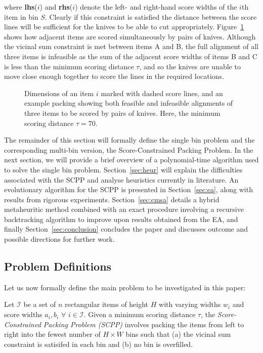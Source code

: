 \documentclass[authoryear]{elsarticle}
\begin{document}
\noindent where \textbf{lhs}($i$) and \textbf{rhs}($i$) denote the left- and right-hand score widths of the $i$th item in bin $S$. Clearly if this constraint is satisfied the distance between the score lines will be sufficient for the knives to be able to cut appropriately. Figure~\ref{fig:itemsdimknives} shows how adjacent items are scored simultaneously by pairs of knives. Although the vicinal sum constraint is met between items A and B, the full alignment of all three items is infeasible as the sum of the adjacent score widths of items B and C is less than the minimum scoring distance $\tau$, and so the knives are unable to move close enough together to score the lines in the required locations.
\begin{figure}[H]	
	\centering
	
	\caption{Dimensions of an item $i$ marked with dashed score lines, and an example packing showing both feasible and infeasible alignments of three items to be scored by pairs of knives. Here, the minimum scoring distance $\tau = 70$.}	
	\label{fig:itemsdimknives}
\end{figure}

\noindent The remainder of this section will formally define the single bin problem and the corresponding multi-bin version, the Score-Constrained Packing Problem. In the next section, we will provide a brief overview of a polynomial-time algorithm used to solve the single bin problem. Section~\ref{sec:heur} will explain the difficulties associated with the SCPP and analyse heuristics currently in literature. An evolutionary algorithm for the SCPP is presented in Section~\ref{sec:ea}, along with results from rigorous experiments. Section~\ref{sec:cmsa} details a hybrid metaheuritic method combined with an exact procedure involving a recursive backtracking algorithm to improve upon results obtained from the EA, and finally Section~\ref{sec:conclusion} concludes the paper and discusses outcome and possible directions for further work.

\subsection{Problem Definitions}
\label{sub:intro}

\noindent Let us now formally define the main problem to be investigated in this paper:

\begin{definition}
	Let $\mathcal{I}$ be a set of $n$ rectangular items of height $H$ with varying widths $w_i$ and score widths $a_i, b_i$ $\forall$ $i \in \mathcal{I}$. Given a minimum scoring distance $\tau$, the \emph{Score-Constrained Packing Problem (SCPP)} involves packing the items from left to right into the fewest number of $H \times W$ bins such that (a) the vicinal sum constraint is satisifed in each bin and (b) no bin is overfilled.
	\label{defn:scpp}
\end{definition}	
\end{document}
